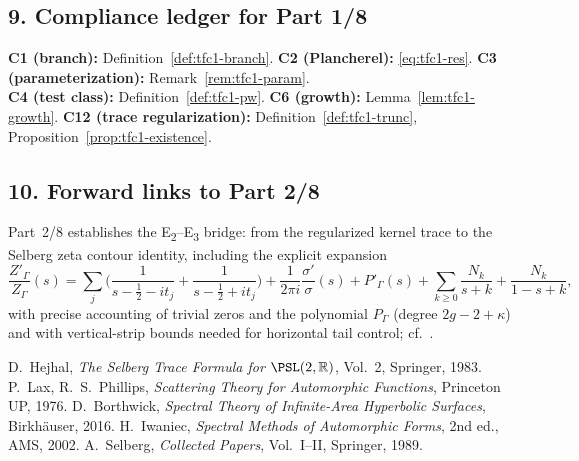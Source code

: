 \subsection*{9. Compliance ledger for Part 1/8}\relax\hspace{0pt}
\label{subsec:tfc1-compliance} %

\noindent
\textbf{C1 (branch):} Definition~\ref{def:tfc1-branch}. \quad
\textbf{C2 (Plancherel):} \eqref{eq:tfc1-res}. \quad
\textbf{C3 (parameterization):} Remark~\ref{rem:tfc1-param}. \\
\textbf{C4 (test class):} Definition~\ref{def:tfc1-pw}. \quad
\textbf{C6 (growth):} Lemma~\ref{lem:tfc1-growth}. \quad
\textbf{C12 (trace regularization):} Definition~\ref{def:tfc1-trunc}, Proposition~\ref{prop:tfc1-existence}.\relax\hspace{0pt}

\subsection*{10. Forward links to Part 2/8}\relax\hspace{0pt}
\label{subsec:tfc1-forward} %

\noindent
Part~2/8 establishes the E\textsubscript{2}--E\textsubscript{3} bridge: from the regularized kernel trace to the Selberg zeta contour identity, including the explicit expansion
\[
\frac{Z'_\Gamma}{Z_\Gamma}(s)=\sum_{j}\Big(\frac{1}{s-\tfrac12-it_j}+\frac{1}{s-\tfrac12+it_j}\Big)+\frac{1}{2\pi i}\frac{\sigma'}{\sigma}(s)+P'_\Gamma(s)+\sum_{k\ge0} \frac{N_k}{s+k}+\frac{N_k}{1-s+k},
\]
with precise accounting of trivial zeros and the polynomial $P_\Gamma$ (degree $2g-2+\kappa$) and with vertical-strip bounds needed for horizontal tail control; cf.\ \cite{HejhalII,Borthwick,IwaniecSpectral}.\relax\hspace{0pt}

\begin{thebibliography}{99} %
 D.~Hejhal, \emph{The Selberg Trace Formula for $\PSL(2,\mathbb{R})$}, Vol.~2, Springer, 1983. %
 P.~Lax, R.~S.~Phillips, \emph{Scattering Theory for Automorphic Functions}, Princeton UP, 1976. %
 D.~Borthwick, \emph{Spectral Theory of Infinite-Area Hyperbolic Surfaces}, Birkhäuser, 2016. %
 H.~Iwaniec, \emph{Spectral Methods of Automorphic Forms}, 2nd ed., AMS, 2002. %
 A.~Selberg, \emph{Collected Papers}, Vol.~I--II, Springer, 1989. %
\end{thebibliography}

